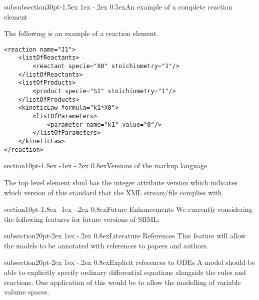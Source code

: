 \documentclass[10pt]{article}
\makeatletter
\renewcommand{\section}{\@startsection%
  {section}{1}{0pt}{-1.8ex \@plus -1ex \@minus -.2ex}%
  {0.8ex}{\normalfont\Large\bfseries}}
\renewcommand{\subsection}{\@startsection%
  {subsection}{2}{0pt}{-2ex \@plus 1ex \@minus -.2ex}%
  {0.8ex}{\slshape\large\bfseries}}
\renewcommand{\subsubsection}{\@startsection%
  {subsubsection}{3}{0pt}{-1.5ex \@plus 1ex \@minus -.2ex}%
  {0.5ex}{\slshape\normalsize\bfseries}}
\newcommand{\tightspacing}{\renewcommand{\baselinestretch}{0.85}}
\newcommand{\regularspacing}{\renewcommand{\baselinestretch}{1.0}}
\newcommand{\class}[1]{\textsf{#1}}
\newcommand{\attrib}[1]{\textsf{#1}}
\makeatother
\begin{document}
\subsubsection{An example of a complete reaction element}

The following is an example of a \class{reaction} element.
\begin{small}
\tightspacing
\begin{verbatim}
<reaction name="J1">
    <listOfReactants>
        <reactant specie="X0" stoichiometry="1"/>
    </listOfReactants>
    <listOfProducts>
        <product specie="S1" stoichiometry="1"/>
    </listOfProducts>
    <kineticLaw formula="k1*X0">
        <listOfParameters>
            <parameter name="k1" value="0"/>
        </listOfParameters>
    </kineticLaw>
</reaction>
\end{verbatim}
\regularspacing
\end{small}

\section{Versions of the markup language}

The top level element \class{sbml} has the integer attribute
\attrib{version} which indicates which version of this standard
that the XML stream/file complies with.

\section{Future Enhancements}
We currently considering the following features for future
versions of SBML:

\subsection{Literature References}
This feature will allow the models to be annotated with
references to papers and authors.


\subsection{Explicit references to ODEs}
A model should be able to explicitly specify ordinary differential
equations alongside the rules and reactions. One application of
this would be to allow the modelling of variable volume spaces.
\end{document}
